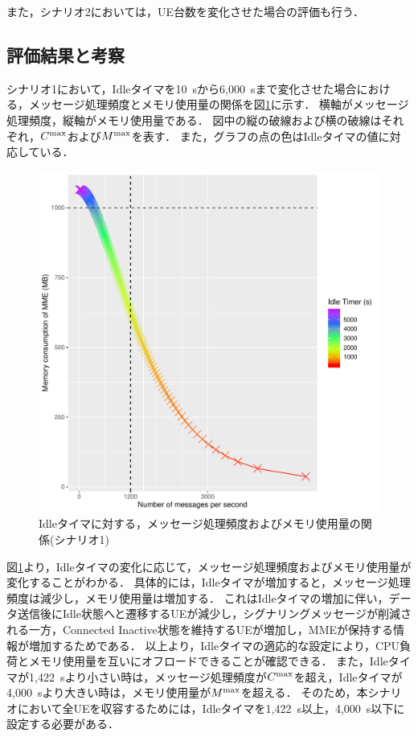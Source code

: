 \documentclass[technicalreport]{ieicej-rev}
\begin{document}
また，シナリオ2においては，UE台数を変化させた場合の評価も行う．

\subsection{評価結果と考察}
シナリオ1において，Idleタイマを10~sから6,000~sまで変化させた場合における，メッセージ処理頻度とメモリ使用量の関係を図\ref{theory_1_all_30s_theory}に示す．
横軸がメッセージ処理頻度，縦軸がメモリ使用量である．
図中の縦の破線および横の破線はそれぞれ，$C^{\rm max}$および$M^{\rm max}$を表す．
また，グラフの点の色はIdleタイマの値に対応している．
\begin{figure}[!t]
  \centering
  \includegraphics[width=1\hsize]{theory_1_all_30s_theory.pdf}
  \caption{Idleタイマに対する，メッセージ処理頻度およびメモリ使用量の関係(シナリオ1)}
  \label{theory_1_all_30s_theory}
\end{figure}
図\ref{theory_1_all_30s_theory}より，Idleタイマの変化に応じて，メッセージ処理頻度およびメモリ使用量が変化することがわかる．
具体的には，Idleタイマが増加すると，メッセージ処理頻度は減少し，メモリ使用量は増加する．
これはIdleタイマの増加に伴い，データ送信後にIdle状態へと遷移するUEが減少し，シグナリングメッセージが削減される一方，Connected Inactive状態を維持するUEが増加し，MMEが保持する情報が増加するためである．
以上より，Idleタイマの適応的な設定により，CPU負荷とメモリ使用量を互いにオフロードできることが確認できる．
また，Idleタイマが1,422~sより小さい時は，メッセージ処理頻度が$C^{\rm max}$を超え，Idleタイマが4,000~sより大きい時は，メモリ使用量が$M^{\rm max}$を超える．
そのため，本シナリオにおいて全UEを収容するためには，Idleタイマを1,422~s以上，4,000~s以下に設定する必要がある．
\end{document}
